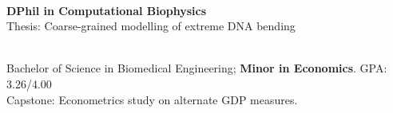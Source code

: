 \documentclass[margin]{res}
\begin{document}
 
\begin{sloppypar}
 

 


\begin{resume} 
\textheight 10.5in %
\setlength{\parskip}{1.00ex}
\setlength{\parindent}{0pt}
 
\\
\textbf{DPhil in Computational Biophysics} \\
Thesis: Coarse-grained modelling of extreme DNA bending


\\
Bachelor of Science in Biomedical Engineering; \textbf{Minor in Economics}. GPA: 3.26/4.00 \\
Capstone: Econometrics study on alternate GDP measures.



\end{resume}
\end{sloppypar}
\end{document}
